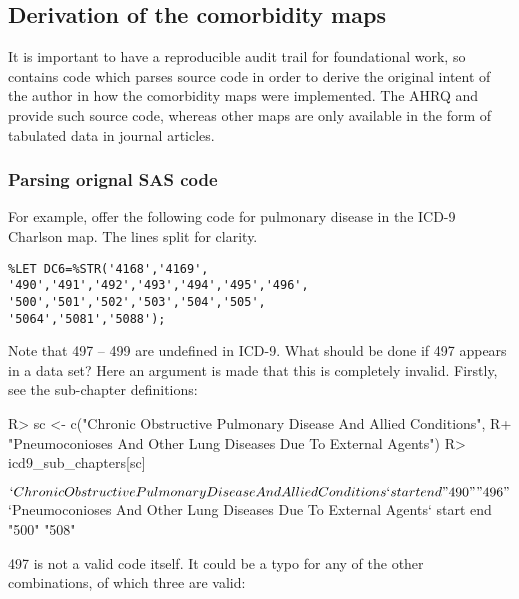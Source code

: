 \documentclass[article]{jss}
\begin{document}
\subsection{Derivation of the comorbidity
maps}\label{derivation-of-the-comorbidity-maps}

It is important to have a reproducible audit trail for foundational
work, so  contains code which parses  source code
in order to derive the original intent of the author in how the
comorbidity maps were implemented. The AHRQ and
\citeauthor{quan_updating_2011} provide such  source code,
whereas other maps are only available in the form of tabulated data in
journal articles.

\subsubsection{Parsing orignal SAS code}\label{parsing-orignal-sas-code}

For example, \citeauthor{quan_updating_2011} offer the following code
for pulmonary disease in the ICD-9 Charlson map. The lines split for
clarity.

\begin{verbatim}
%LET DC6=%STR('4168','4169',
'490','491','492','493','494','495','496',
'500','501','502','503','504','505',
'5064','5081','5088');
\end{verbatim}

Note that 497 -- 499 are undefined in ICD-9. What should be done if 497
appears in a data set? Here an argument is made that this is completely
invalid. Firstly, see the sub-chapter definitions:

\begin{CodeChunk}

\begin{CodeInput}
R> sc <- c("Chronic Obstructive Pulmonary Disease And Allied Conditions",
R+         "Pneumoconioses And Other Lung Diseases Due To External Agents")
R> icd9_sub_chapters[sc]
\end{CodeInput}

\begin{CodeOutput}
$`Chronic Obstructive Pulmonary Disease And Allied Conditions`
start   end 
"490" "496" 

$`Pneumoconioses And Other Lung Diseases Due To External Agents`
start   end 
"500" "508" 
\end{CodeOutput}
\end{CodeChunk}

497 is not a valid code itself. It could be a typo for any of the other
combinations, of which three are valid:
\end{document}
